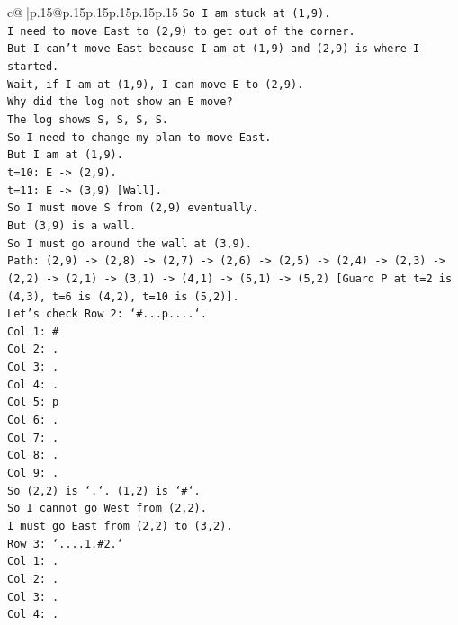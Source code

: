 \documentclass{article}
\begin{document}
{\begin{supertabular}{c@{$\;$}|p{.15\linewidth}@{}p{.15\linewidth}p{.15\linewidth}p{.15\linewidth}p{.15\linewidth}p{.15\linewidth}}
{{{\texttt{So I am stuck at (1,9).} \\
\texttt{I need to move East to (2,9) to get out of the corner.} \\
\texttt{But I can't move East because I am at (1,9) and (2,9) is where I started.} \\
\texttt{Wait, if I am at (1,9), I can move E to (2,9).} \\
\texttt{Why did the log not show an E move?} \\
\texttt{The log shows S, S, S, S.} \\
\texttt{So I need to change my plan to move East.} \\
\texttt{But I am at (1,9).} \\
\texttt{t=10: E {-}> (2,9).} \\
\texttt{t=11: E {-}> (3,9) {[}Wall{]}.} \\
\texttt{So I must move S from (2,9) eventually.} \\
\texttt{But (3,9) is a wall.} \\
\texttt{So I must go around the wall at (3,9).} \\
\texttt{Path: (2,9) {-}> (2,8) {-}> (2,7) {-}> (2,6) {-}> (2,5) {-}> (2,4) {-}> (2,3) {-}> (2,2) {-}> (2,1) {-}> (3,1) {-}> (4,1) {-}> (5,1) {-}> (5,2) {[}Guard P at t=2 is (4,3), t=6 is (4,2), t=10 is (5,2){]}.} \\
\texttt{Let's check Row 2: `\#...p....`.} \\
\texttt{Col 1: \#} \\
\texttt{Col 2: .} \\
\texttt{Col 3: .} \\
\texttt{Col 4: .} \\
\texttt{Col 5: p} \\
\texttt{Col 6: .} \\
\texttt{Col 7: .} \\
\texttt{Col 8: .} \\
\texttt{Col 9: .} \\
\texttt{So (2,2) is `.`. (1,2) is `\#`.} \\
\texttt{So I cannot go West from (2,2).} \\
\texttt{I must go East from (2,2) to (3,2).} \\
\texttt{Row 3: `....1.\#2.`} \\
\texttt{Col 1: .} \\
\texttt{Col 2: .} \\
\texttt{Col 3: .} \\
\texttt{Col 4: .} \\
}}}
\end{supertabular}}
\end{document}
